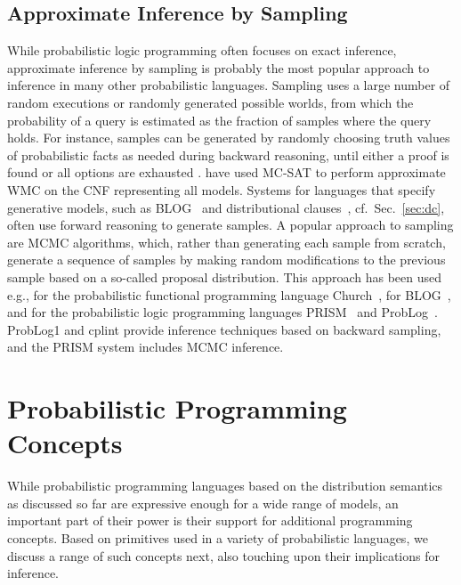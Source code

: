 \documentclass[a4paper]{article}
\begin{document}
\subsection{Approximate Inference by Sampling}\label{sec:sampling}
While probabilistic logic programming  often
focuses on exact inference, approximate inference by sampling is
probably the most popular approach to inference in many other
probabilistic languages. Sampling uses a large number of random executions or randomly
generated possible worlds, from which the probability of a query is 
estimated as the fraction of samples where the query holds. For
instance, samples can be generated by randomly choosing truth
values of probabilistic facts as needed during backward reasoning,
until either a proof is found or all options are exhausted
\citep{Kimmig08,bragaglia:ilp11,riguzzi:fi13}. 
\cite{Fierens13} have used MC-SAT \citep{poon:aaai06} to perform
approximate WMC on the CNF representing all models.  
Systems
for languages that specify generative models, such as
BLOG~\citep{Milch05} and distributional clauses~\citep{Gutmann11},
cf.~Sec.~\ref{sec:dc}, often use forward reasoning to generate
samples. A popular approach to sampling are MCMC algorithms, which,
rather than generating each sample from scratch, generate a sequence
of samples by making random modifications to the previous sample based
on a so-called proposal distribution. This approach has been used
e.g., for the probabilistic functional programming language
Church~\citep{Goodman08}, for BLOG~\citep{arora:uai10}, and for the
probabilistic logic programming languages
PRISM~\citep{sato:ijcai11} and ProbLog~\citep{Moldovan13}. ProbLog1
and cplint provide inference techniques based on backward sampling,
and the PRISM system includes MCMC inference.  





\section{Probabilistic Programming Concepts}
\label{sec:concepts}

While probabilistic programming languages based on the distribution
semantics as discussed so far are expressive enough for a wide range
of models, an important part of their power is their support for
additional programming concepts. Based on primitives used in a variety
of probabilistic languages, we discuss a range of such concepts
next, also touching upon their implications for inference. 
\end{document}
